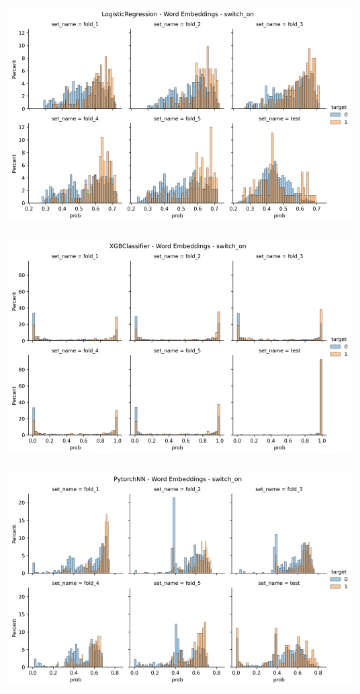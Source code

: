 \begin{figure}
    \centering
    \begin{subfigure}[b]{0.83\textwidth}
    \includegraphics[width=\linewidth]{figures/results/word_embeddings/lgr/switch_on/switch_on__distplot.png}
    \end{subfigure}
    \hfill
    \centering
    \begin{subfigure}[b]{0.83\textwidth}
        \centering
        \includegraphics[width=\linewidth]{figures/results/word_embeddings/xgboost/switch_on/xgb__distplot.png}
    \end{subfigure}
    \hfill
    \centering
    \begin{subfigure}[b]{0.83\textwidth}
        \centering
        \includegraphics[width=\linewidth]{figures/results/word_embeddings/nn/switch_on/switch_on__distplot (1).png}

\end{subfigure}
\end{figure}
